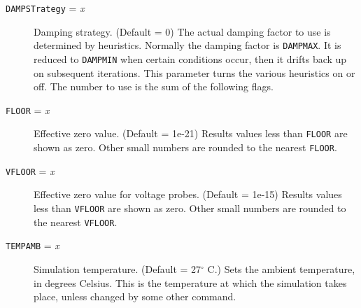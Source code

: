 \begin{description}
\item[{\tt DAMPSTrategy} = {\it x}] Damping strategy.  (Default =
0)  The actual damping factor to use is determined by heuristics.
Normally the damping factor is {\tt DAMPMAX}.  It is reduced to
{\tt DAMPMIN} when certain conditions occur, then it drifts back
up on subsequent iterations.  This parameter turns the various
heuristics on or off.  The number to use is the sum of the following
flags.

        
\item[{\tt FLOOR} = {\it x}] Effective zero value.  (Default =
1e-21) Results values less than {\tt FLOOR} are shown as zero.  Other
small numbers are rounded to the nearest {\tt FLOOR}.
        
\item[{\tt VFLOOR} = {\it x}] Effective zero value for voltage probes.
(Default = 1e-15) Results values less than {\tt VFLOOR} are shown as
zero.  Other small numbers are rounded to the nearest {\tt VFLOOR}.
        
\item[{\tt TEMPAMB} = {\it x}] Simulation temperature.
(Default = 27$^{\circ}$ C.)  Sets the ambient temperature, in
degrees Celsius.  This is the temperature at which the
simulation takes place, unless changed by some other command.


\end{description}
